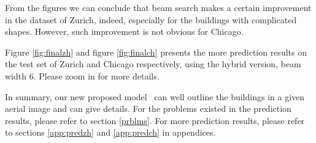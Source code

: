 

From the figures we can conclude that beam search makes a certain improvement in the dataset of Zurich, indeed, especially for the buildings with complicated shapes. However, such improvement is not obvious for Chicago.

Figure \ref{fig:finalzh} and figure \ref{fig:finalch} presents the more prediction results on the test set of Zurich and Chicago respectively, using the hybrid version, beam width 6. Please zoom in for more details.


\pagebreak


In summary, our new proposed model \modelnameshort\ can well outline the buildings in a given aerial image and can give details. For the problems existed in the prediction results, please refer to section \ref{prblms}. For more prediction results, please refer to sections \ref{app:predzh} and \ref{app:predch} in appendices.

